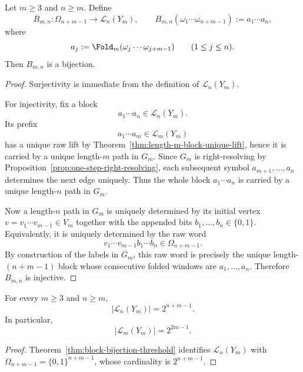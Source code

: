 \begin{theorem}
\label{thm:block-bijection-threshold}
Let $m\ge 3$ and $n\ge m$.  Define
\[
B_{m,n}:\Omega_{n+m-1}\to\mathcal L_n(Y_m),
\qquad
B_{m,n}(\omega_1\cdots\omega_{n+m-1}):=a_1\cdots a_n,
\]
where
\[
a_j:=\Fold_m(\omega_j\cdots\omega_{j+m-1})
\qquad (1\le j\le n).
\]
Then $B_{m,n}$ is a bijection.
\end{theorem}

\begin{proof}
Surjectivity is immediate from the definition of $\mathcal L_n(Y_m)$.

For injectivity, fix a block
\[
a_1\cdots a_n\in\mathcal L_n(Y_m).
\]
Its prefix
\[
a_1\cdots a_m\in\mathcal L_m(Y_m)
\]
has a unique raw lift by Theorem~\ref{thm:length-m-block-unique-lift}, hence it
is carried by a unique length-$m$ path in $G_m$.  Since $G_m$ is right-resolving
by Proposition~\ref{prop:one-step-right-resolving}, each subsequent symbol
$a_{m+1},\ldots,a_n$ determines the next edge uniquely.  Thus the whole block
$a_1\cdots a_n$ is carried by a unique length-$n$ path in $G_m$.

Now a length-$n$ path in $G_m$ is uniquely determined by its initial vertex
$v=v_1\cdots v_{m-1}\in V_m$ together with the appended bits
$b_1,\ldots,b_n\in\{0,1\}$.  Equivalently, it is uniquely determined by the raw
word
\[
v_1\cdots v_{m-1}b_1\cdots b_n\in\Omega_{n+m-1}.
\]
By construction of the labels in $G_m$, this raw word is precisely the unique
length-$(n+m-1)$ block whose consecutive folded windows are
$a_1,\ldots,a_n$.  Therefore $B_{m,n}$ is injective.
\end{proof}

\begin{corollary}
\label{cor:block-counts-threshold}
For every $m\ge 3$ and $n\ge m$,
\[
\lvert\mathcal L_n(Y_m)\rvert=2^{n+m-1}.
\]
In particular,
\[
\lvert\mathcal L_m(Y_m)\rvert=2^{2m-1}.
\]
\end{corollary}

\begin{proof}
Theorem~\ref{thm:block-bijection-threshold} identifies $\mathcal L_n(Y_m)$
with $\Omega_{n+m-1}=\{0,1\}^{n+m-1}$, whose cardinality is $2^{n+m-1}$.
\end{proof}

